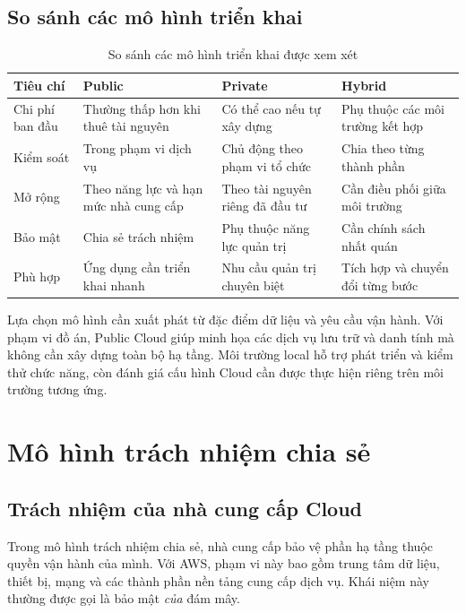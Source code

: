 \subsection{So sánh các mô hình triển khai}
\begin{table}[htbp]
\centering\small
\caption{So sánh các mô hình triển khai được xem xét}
\begin{tabularx}{\textwidth}{@{}>{\raggedright\arraybackslash}p{2.2cm}XXX@{}}
\toprule
\textbf{Tiêu chí} & \textbf{Public} & \textbf{Private} & \textbf{Hybrid} \\
\midrule
Chi phí ban đầu & Thường thấp hơn khi thuê tài nguyên & Có thể cao nếu tự xây dựng & Phụ thuộc các môi trường kết hợp \\
Kiểm soát & Trong phạm vi dịch vụ & Chủ động theo phạm vi tổ chức & Chia theo từng thành phần \\
Mở rộng & Theo năng lực và hạn mức nhà cung cấp & Theo tài nguyên riêng đã đầu tư & Cần điều phối giữa môi trường \\
Bảo mật & Chia sẻ trách nhiệm & Phụ thuộc năng lực quản trị & Cần chính sách nhất quán \\
Phù hợp & Ứng dụng cần triển khai nhanh & Nhu cầu quản trị chuyên biệt & Tích hợp và chuyển đổi từng bước \\
\bottomrule
\end{tabularx}
\end{table}

Lựa chọn mô hình cần xuất phát từ đặc điểm dữ liệu và yêu cầu vận hành. Với phạm vi đồ án, Public Cloud giúp minh họa các dịch vụ lưu trữ và danh tính mà không cần xây dựng toàn bộ hạ tầng. Môi trường local hỗ trợ phát triển và kiểm thử chức năng, còn đánh giá cấu hình Cloud cần được thực hiện riêng trên môi trường tương ứng.

\section{Mô hình trách nhiệm chia sẻ}
\subsection{Trách nhiệm của nhà cung cấp Cloud}
Trong mô hình trách nhiệm chia sẻ, nhà cung cấp bảo vệ phần hạ tầng thuộc quyền vận hành của mình. Với AWS, phạm vi này bao gồm trung tâm dữ liệu, thiết bị, mạng và các thành phần nền tảng cung cấp dịch vụ. Khái niệm này thường được gọi là bảo mật \textit{của} đám mây.\cite{shared}

